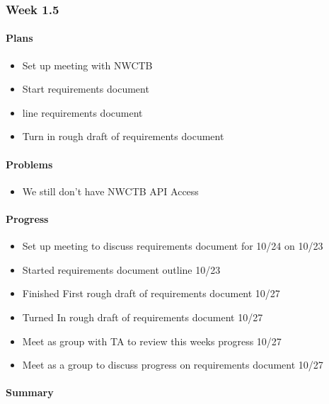 \documentclass[onecolumn, draftclsnofoot,10pt, compsoc]{article}
\begin{document}
		\subsubsection{Week 1.5}
			\paragraph{Plans} \hfill \break
		        
		        \begin{itemize}
		            \item Set up meeting with NWCTB
		            \item Start requirements document
		            \item line requirements document
		            \item Turn in rough draft of requirements document
		        \end{itemize}
		        
		    \paragraph{Problems} \hfill \break
		        \begin{itemize}
		            \item We still don't have NWCTB API Access
		        \end{itemize}
		
		    \paragraph{Progress} \hfill \break
		    
		    \begin{itemize}
		        \item Set up meeting to discuss requirements document for 10/24 on 10/23
		        \item Started requirements document outline 10/23
		        \item Finished First rough draft of requirements document 10/27
		        \item Turned In rough draft of requirements document 10/27
		        \item Meet as group with TA to review this weeks progress 10/27
		        \item Meet as a group to discuss progress on requirements document 10/27
		    \end{itemize}
		    
		    \paragraph{Summary}
		        
\end{document}
